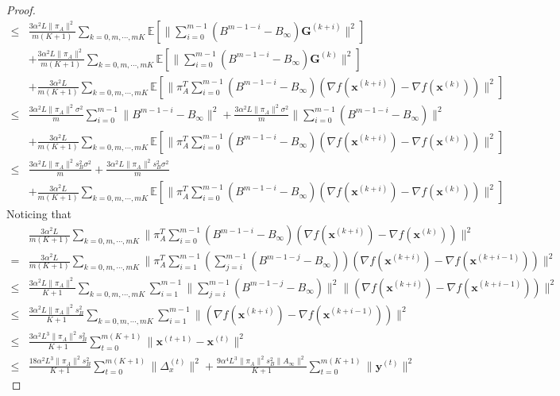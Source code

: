 \documentclass{article}
\newcommand{\vx}{{\mathbf{x}}}
\newcommand{\vy}{{\mathbf{y}}}
\newcommand{\EE}[1]{\mathbb{E}\left[#1\right]}
\newcommand{\norm}[1]{\| #1 \|}
\begin{document}
\begin{proof}
\begin{align*}
    \leq &\frac{3\alpha^2L\norm{\pi_A}^2}{m(K+1)}\sum_{k=0,m,\cdots,mK}\EE{\norm{\sum_{i=0}^{m-1}(B^{m-1-i}-B_{\infty})\mathbf{G}^{(k+i)}}^2}\\&+\frac{3\alpha^2L\norm{\pi_A}^2}{m(K+1)}\sum_{k=0,m,\cdots,mK}\EE{\norm{\sum_{i=0}^{m-1}(B^{m-1-i}-B_{\infty})\mathbf{G}^{(k)}}^2}\\&+\frac{3\alpha^2L}{m(K+1)}\sum_{k=0,m,\cdots,mK}\EE{\norm{\pi_A^T\sum_{i=0}^{m-1}(B^{m-1-i}-B_{\infty})(\nabla f(\vx^{(k+i)})-\nabla f(\vx^{(k)}))}^2}\\ 
    \leq&\frac{3\alpha^2L\norm{\pi_A}^2\sigma^2}{m}\sum_{i=0}^{m-1}\norm{B^{m-1-i}-B_{\infty}}^2+\frac{3\alpha^2L\norm{\pi_A}^2\sigma^2}{m}\norm{\sum_{i=0}^{m-1}(B^{m-1-i}-B_{\infty})}^2\\&+\frac{3\alpha^2L}{m(K+1)}\sum_{k=0,m,\cdots,mK}\EE{\norm{\pi_A^T\sum_{i=0}^{m-1}(B^{m-1-i}-B_{\infty})(\nabla f(\vx^{(k+i)})-\nabla f(\vx^{(k)}))}^2}\\ 
    \leq& \frac{3\alpha^2L\norm{\pi_A}^2s_B^2\sigma^2}{m}+\frac{3\alpha^2L\norm{\pi_A}^2s_B^2\sigma^2}{m}\\&+\frac{3\alpha^2L}{m(K+1)}\sum_{k=0,m,\cdots,mK}\EE{\norm{\pi_A^T\sum_{i=0}^{m-1}(B^{m-1-i}-B_{\infty})(\nabla f(\vx^{(k+i)})-\nabla f(\vx^{(k)}))}^2}
  \end{align*}
  Noticing that 
  \begin{align*}
    &\frac{3\alpha^2L}{m(K+1)}\sum_{k=0,m,\cdots,mK}\norm{\pi_A^T\sum_{i=0}^{m-1}(B^{m-1-i}-B_{\infty})(\nabla f(\vx^{(k+i)})-\nabla f(\vx^{(k)}))}^2
    \\ =&\frac{3\alpha^2L}{m(K+1)}\sum_{k=0,m,\cdots,mK}\norm{\pi_A^T\sum_{i=1}^{m-1}(\sum_{j=i}^{m-1}(B^{m-1-j}-B_{\infty}))(\nabla f(\vx^{(k+i)})-\nabla f(\vx^{(k+i-1)}))}^2
    \\ \leq& \frac{3\alpha^2L\norm{\pi_A}^2}{K+1}\sum_{k=0,m,\cdots,mK}\sum_{i=1}^{m-1}\norm{\sum_{j=i}^{m-1}(B^{m-1-j}-B_{\infty})}^2\norm{(\nabla f(\vx^{(k+i)})-\nabla f(\vx^{(k+i-1)}))}^2\\
    \leq&\frac{3\alpha^2L\norm{\pi_A}^2s_B^2}{K+1}\sum_{k=0,m,\cdots,mK}\sum_{i=1}^{m-1}\norm{(\nabla f(\vx^{(k+i)})-\nabla f(\vx^{(k+i-1)}))}^2\\
    \leq&\frac{3\alpha^2L^3\norm{\pi_A}^2s_B^2}{K+1}\sum_{t=0}^{m(K+1)}\norm{\vx^{(t+1)}-\vx^{(t)}}^2\\
    \leq&\frac{18\alpha^2L^3\norm{\pi_A}^2s_B^2}{K+1}\sum_{t=0}^{m(K+1)}\norm{\Delta_x^{(t)}}^2+\frac{9\alpha^4L^3\norm{\pi_A}^2s_B^2\norm{A_{\infty}}^2}{K+1}\sum_{t=0}^{m(K+1)}\norm{\vy^{(t)}}^2
  \end{align*}

\end{proof}
\end{document}
